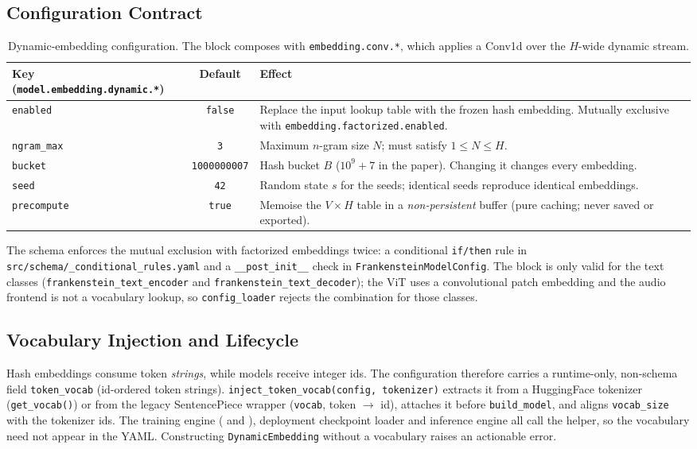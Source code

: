 \subsection{Configuration Contract}

\begin{table}[H]
\centering
\small
\begin{tabularx}{\linewidth}{@{}l c X@{}}
\toprule
\textbf{Key (\texttt{model.embedding.dynamic.*})} & \textbf{Default} & \textbf{Effect} \\
\midrule
\texttt{enabled} & \texttt{false} & Replace the input lookup table with the frozen hash embedding. Mutually exclusive with \texttt{embedding.factorized.enabled}. \\
\texttt{ngram\_max} & \texttt{3} & Maximum $n$-gram size $N$; must satisfy $1 \le N \le H$. \\
\texttt{bucket} & \texttt{1000000007} & Hash bucket $B$ ($10^9+7$ in the paper). Changing it changes every embedding. \\
\texttt{seed} & \texttt{42} & Random state $s$ for the seeds; identical seeds reproduce identical embeddings. \\
\texttt{precompute} & \texttt{true} & Memoise the $V\times H$ table in a \emph{non-persistent} buffer (pure caching; never saved or exported). \\
\bottomrule
\end{tabularx}
\caption{Dynamic-embedding configuration. The block composes with \texttt{embedding.conv.*}, which applies a Conv1d over the $H$-wide dynamic stream.}
\label{tab:dynamic-embedding-config}
\end{table}

The schema enforces the mutual exclusion with factorized embeddings twice: a conditional \texttt{if/then} rule in \texttt{src/schema/\_conditional\_rules.yaml} and a \texttt{\_\_post\_init\_\_} check in \texttt{FrankensteinModelConfig}. The block is only valid for the text classes (\texttt{frankenstein\_text\_encoder} and \texttt{frankenstein\_text\_decoder}); the ViT uses a convolutional patch embedding and the audio frontend is not a vocabulary lookup, so \texttt{config\_loader} rejects the combination for those classes.

\subsection{Vocabulary Injection and Lifecycle}

Hash embeddings consume token \emph{strings}, while models receive integer ids. The configuration therefore carries a runtime-only, non-schema field \texttt{token\_vocab} (id-ordered token strings). \texttt{inject\_token\_vocab(config, tokenizer)} extracts it from a HuggingFace tokenizer (\texttt{get\_vocab()}) or from the legacy SentencePiece wrapper (\texttt{vocab}, token $\to$ id), attaches it before \texttt{build\_model}, and aligns \texttt{vocab\_size} with the tokenizer ids. The training engine ( and ), deployment checkpoint loader and inference engine all call the helper, so the vocabulary need not appear in the YAML. Constructing \texttt{DynamicEmbedding} without a vocabulary raises an actionable error.

